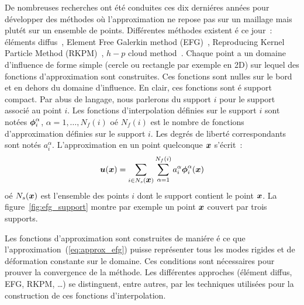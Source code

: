 De nombreuses recherches ont \'et\'e conduites
ces dix derni\'eres ann\'ees pour d\'evelopper
des m\'ethodes o\`u l'approximation ne repose pas
sur un maillage mais plut\'et sur un ensemble de points.
Diff\'erentes m\'ethodes existent \'e ce jour~:
\'el\'ements diffus~\cite{Touzot:diffus},
Element Free Galerkin method (EFG)~\cite{TB:EFG},
Reproducing Kernel Particle Method (RKPM)~\cite{Liu:RKPM93},
$h-p$ cloud method~\cite{DuarteOdenCloud96}.
Chaque point a un domaine d'influence
de forme simple (cercle ou rectangle par exemple en 2D) sur lequel
des fonctions d'approximation sont construites.
Ces fonctions sont nulles sur le bord et en dehors
du domaine d'influence. En clair, ces fonctions sont
 \'e support compact.
Par abus de langage, nous parlerons
du support $i$ pour le support associ\'e au point $i$.
Les fonctions d'interpolation d\'efinies sur le support $i$ sont
not\'ees $\mbox{\boldmath $\phi$}_i^\alpha$, $\alpha = 1, \ldots, N_f(i)$
o\'e  $N_f(i)$ est le nombre de fonctions d'approximation
d\'efinies sur le support $i$.
Les degr\'es de libert\'e correspondants  sont not\'es
$a_i^\alpha$. L'approximation en un point quelconque
$\mbox{\boldmath $x$}$ s'\'ecrit~:
\begin{equation}
  \label{eq:approx_efg}
  \mbox{\boldmath $u$}(\mbox{\boldmath $x$}) = \sum_{i \in N_s(\mbox{\boldmath $x$})} \sum_{\alpha = 1}^{N_f(i)} a_i^\alpha \mbox{\boldmath $\phi$}_i^\alpha(\mbox{\boldmath $x$})
\end{equation}
o\'e $N_s(\mbox{\boldmath $x$})$ est l'ensemble des points $i$ dont le support
contient le point $\mbox{\boldmath $x$}$. La figure~\ref{fig:efg_support} montre par exemple un point
$\mbox{\boldmath $x$}$ couvert par trois supports.



Les fonctions d'approximation sont construites de
mani\'ere \'e ce que l'approximation~(\ref{eq:approx_efg})
puisse repr\'esenter tous les modes rigides
et de d\'eformation constante sur le domaine.
Ces conditions sont n\'ecessaires pour prouver la convergence
de la m\'ethode. Les diff\'erentes approches
(\'el\'ement diffus, EFG, RKPM, \ldots)
se distinguent, entre autres, par les techniques
utilis\'ees pour la construction de ces fonctions d'interpolation.


